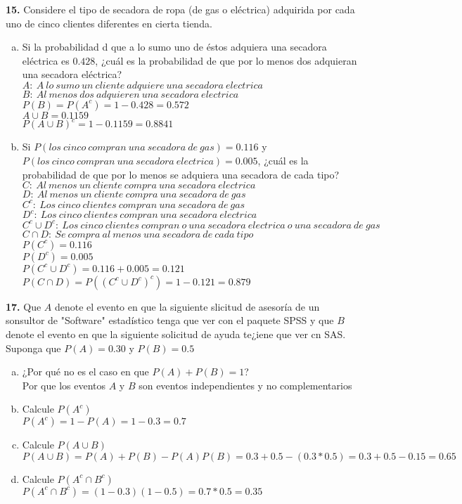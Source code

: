 \documentclass[12pt, letterpaper, spanish]{article}
\begin{document}
\textbf{15.} Considere el tipo de secadora de ropa (de gas o eléctrica) adquirida por cada uno de cinco clientes diferentes en cierta tienda.
\begin{enumerate}[a)]
    \item Si la probabilidad d que a lo sumo uno de éstos adquiera una secadora eléctrica es $0.428$, ¿cuál es la probabilidad de que por lo menos dos adquieran una secadora eléctrica?\\
    $A:\ A\ lo\ sumo\ un\ cliente\ adquiere\ una\ secadora\ electrica$\\
    $B:\ Al\ menos\ dos\ adquieren\ una\ secadora\ electrica$\\
    $P(B)=P(A^c)=1-0.428=0.572$\\
    $A\cup B = 0.1159$\\
    	$P(A\cup B)^c= 1-0.1159 = 0.8841$
    \item Si $P(los\ cinco\ compran\ una\ secadora\ de\ gas)=0.116$ y $P(los\ cinco\ compran\ una\ secadora\ electrica) = 0.005$, ¿cuál es la probabilidad de que por lo menos se adquiera una secadora de cada tipo?\\
    $C:\ Al\ menos\ un\ cliente\ compra\ una\ secadora\ electrica$\\
    $D:\ Al\ menos\ un\ cliente\ compra\ una\ secadora\ de\ gas$\\
    $C^c:\ Los\ cinco\ clientes\ compran\ una\ secadora\ de\ gas$\\
    $D^c:\ Los\ cinco\ clientes\ compran\ una\ secadora\ electrica$\\
    $C^c\cup D^c:\ Los\ cinco\ clientes\ compran\ o\ una\ secadora\ electrica\ o\ una\ secadora\ de\ gas$\\
    $C\cap D:\ Se\ compra\ al\ menos\ una\ secadora\ de\ cada\ tipo$\\
    $P(C^c)=0.116$\\
    $P(D^c)=0.005$\\
    $P(C^c\cup D^c)=0.116+0.005=0.121$\\
    $P(C\cap D)=P((C^c\cup D^c)^c)=1-0.121=0.879$\\

\end{enumerate}
\textbf{17.} Que $A$ denote el evento en que la siguiente slicitud de asesoría de un sonsultor de "Software" estadístico tenga que ver con el paquete SPSS y que $B$ denote el evento en que la siguiente solicitud de ayuda te¿iene que ver cn SAS. Suponga que $P(A)=0.30$ y $P(B)=0.5$
\begin{enumerate}[a)]
    \item ¿Por qué no es el caso en que $P(A)+P(B)=1$?\\
    Por que los eventos $A$ y $B$ son eventos independientes y no complementarios
    \item Calcule $P(A^c)$\\
    $P(A^c)=1-P(A)=1-0.3=0.7$
    \item Calcule $P(A\cup B)$\\
    $P(A\cup B)=P(A)+P(B)-P(A)P(B)=0.3+0.5-(0.3*0.5)=0.3+0.5-0.15=0.65$
    \item Calcule $P(A^c\cap B^c)$\\
    $P(A^c\cap B^c)=(1-0.3)(1-0.5)=0.7*0.5=0.35$
\end{enumerate}
\end{document}
